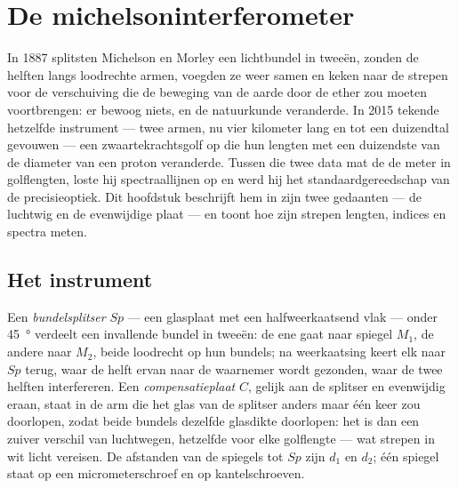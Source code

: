 \chapter{De michelsoninterferometer}\label{ch:b2:michelson}

In 1887 splitsten Michelson en Morley een lichtbundel in tweeën,
zonden de helften langs loodrechte armen, voegden ze weer samen en
keken naar de strepen voor de verschuiving die de beweging van de
aarde door de ether zou moeten voortbrengen: er bewoog niets, en de
natuurkunde veranderde. In 2015 tekende hetzelfde instrument --- twee
armen, nu vier kilometer lang en tot een duizendtal gevouwen --- een
zwaartekrachtsgolf op die hun lengten met een duizendste van de
diameter van een proton veranderde. Tussen die twee data mat de
 de meter in golflengten, loste hij
spectraallijnen op en werd hij het standaardgereedschap van de
precisieoptiek. Dit hoofdstuk beschrijft hem in zijn twee gedaanten
--- de luchtwig en de evenwijdige plaat --- en toont hoe zijn strepen
lengten, indices en spectra meten.

\section{Het instrument}

\begin{definition}[De michelsoninterferometer]\label{def:b2:michelson:instrument}
Een \emph{bundelsplitser} $Sp$ --- een glasplaat met een halfweerkaatsend
vlak --- onder \qty{45}{\degree} verdeelt een invallende bundel in tweeën: de
ene gaat naar spiegel $M_1$, de andere naar $M_2$, beide loodrecht op hun
bundels; na weerkaatsing keert elk naar $Sp$ terug, waar de helft ervan
naar de waarnemer wordt gezonden, waar de twee helften interfereren. Een
\emph{compensatieplaat} $C$, gelijk aan de splitser en evenwijdig
eraan, staat in de arm die het glas van de splitser anders maar één
keer zou doorlopen, zodat beide bundels dezelfde glasdikte doorlopen:
het  is dan een zuiver verschil van luchtwegen, hetzelfde
voor elke golflengte --- wat strepen in wit licht vereisen. De
afstanden van de spiegels tot $Sp$ zijn $d_1$ en $d_2$; één spiegel staat
op een micrometerschroef en op kantelschroeven.
\end{definition}

